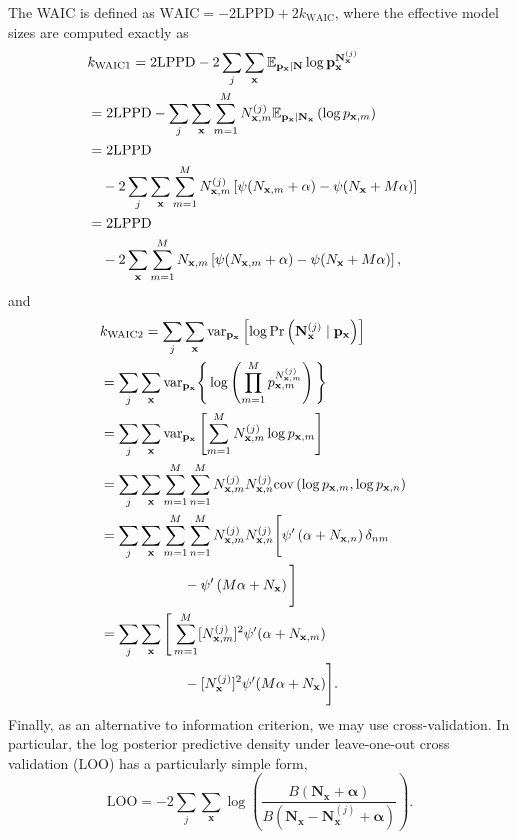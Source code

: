 \documentclass{IOS-Book-Article}
\newcommand{\bN}{\mathbf{N}}
\newcommand{\bx}{\mathbf{x}}
\newcommand{\bp}{\mathbf{p}}
\newcommand{\balpha}{{\boldsymbol\alpha}}
\newcommand{\var}{\mathrm{var}}
\newcommand{\cov}{\mathrm{cov}}
\begin{document}
The WAIC is defined as $\textrm{WAIC} = -2\textrm{LPPD}+2k_{\textrm{WAIC}}$, where the effective model sizes are computed exactly as
\begin{align}
\lefteqn{k_{\textrm{WAIC1}} = 2\textrm{LPPD}-2\sum_j \sum_\bx \mathbb{E}_{\bp_\bx\vert\bN}\log\bp_\bx^{\bN_{\bx}^{(j)}}  }\nonumber \\
&= 2 \textrm{LPPD} -  \sum_j\sum_{\bx}\sum_{m=1}^M N_{\bx,m}^{(j)} \mathbb{E}_{\bp_\bx\vert \bN_\bx} \left(\log p_{\bx,m} \right) \nonumber\\
& = 2 \textrm{LPPD} \nonumber\\
&\quad- 2\sum_j \sum_\bx  \sum_{m=1}^MN_{\bx,m}^{(j)} \left[ \psi(N_{\bx,m}+ \alpha ) - \psi(N_{\bx}  + M\alpha ) \right]  \nonumber\\
&= 2 \textrm{LPPD} \nonumber\\
&\quad- 2\sum_{\bx}\sum_{m=1}^M N_{\bx,m}\left[ \psi(N_{\bx,m}+ \alpha ) - \psi(N_{\bx}  + M\alpha ) \right],
\end{align}
and
\begin{align}
\lefteqn{k_{\textrm{WAIC2}} =\sum_j \sum_\bx \var_{\bp_\bx}\left[ \log  \Pr\left(\mathbf{N}^{(j)}_{\bx} \mid \bp_\bx \right)   \right] }\nonumber \\
&=\sum_j\sum_{\bx} \var_{\bp_\bx}\Bigg\{ \log\left( %
\prod_{m=1}^{M} p_{\bx,m}^{N^{(j)}_{\bx,m}} \right)   \Bigg\} \nonumber\\
&=\sum_j\sum_\bx   \var_{\bp_\bx}\left[  \sum_{m=1}^M N^{(j)}_{\bx,m} \log p_{\bx,m} \right] \nonumber\\
&= \sum_j\sum_\bx \sum_{m=1}^M \sum_{n=1}^M N^{(j)}_{\bx,m} N^{(j)}_{\bx,n} \cov\left( \log p_{\bx,m}, \log p_{\bx,n} \right) \nonumber\\
&= \sum_j\sum_\bx \sum_{m=1}^M \sum_{n=1}^M N^{(j)}_{\bx,m} N^{(j)}_{\bx,n}\Bigg[  \psi^\prime\left( \alpha+N_{\bx,n} \right)\delta_{nm} \nonumber\\
&\qquad\qquad\qquad- \psi^\prime\left( M\alpha+N_\bx \right) \Bigg] \nonumber\\
&=\sum_j \sum_\bx \Bigg[\sum_{m=1}^M [N^{(j)}_{\bx,m}]^2\psi^\prime(\alpha+N_{\bx,m}) \nonumber\\
&\qquad\qquad\qquad-[N^{(j)}_{\bx}]^2\psi^\prime(M\alpha+N_\bx)  \Bigg].
\end{align}
Finally, as an alternative to information criterion, we may use cross-validation. In particular, the log posterior predictive density under leave-one-out cross validation (LOO)
has a particularly simple form,
\begin{equation}
\textrm{LOO} = -2\sum_j \sum_{\bx}  \log\left(  \frac{B(\bN_\bx  +\balpha)}{B(\bN_\bx -\bN_{\bx}^{(j)} +\balpha)} \right) .
\end{equation}
\end{document}
